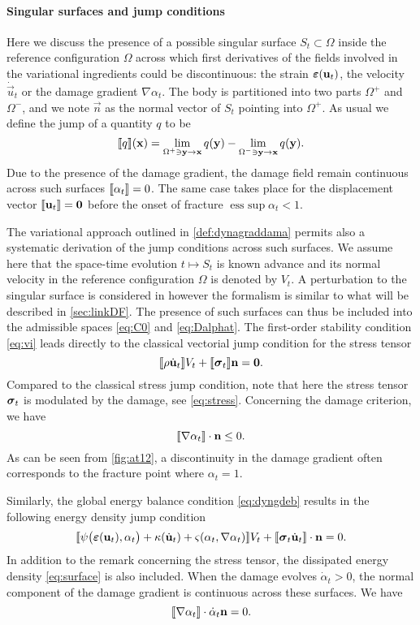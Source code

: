 \paragraph{Singular surfaces and jump conditions}
Here we discuss the presence of a possible singular surface $S_t\subset\Omega$ inside the reference configuration $\Omega$ across which first derivatives of the fields involved in the variational ingredients could be discontinuous: the strain $\eps(\vec{u}_t)$, the velocity $\dot{\vec{u}}_t$ or the damage gradient $\nabla\alpha_t$. The body is partitioned into two parts $\Omega^+$ and $\Omega^-$, and we note $\vec{n}$ as the normal vector of $S_t$ pointing into $\Omega^+$. As usual we define the jump of a quantity $q$ to be
\[
\jump{q}(\vec{x})=\lim_{\Omega{^+}\ni\vec{y}\to\vec{x}}q(\vec{y})-\lim_{\Omega{^-}\ni\vec{y}\to\vec{x}}q(\vec{y}).
\]
Due to the presence of the damage gradient, the damage field remain continuous across such surfaces $\llbracket{\alpha_t}\rrbracket=0$. The same case takes place for the displacement vector $\jump{\vec{u}_t}=\vec{0}$ before the onset of fracture $\operatorname{ess\ sup}\alpha_t< 1$.

The variational approach outlined in \cref{def:dynagraddama} permits also a systematic derivation of the jump conditions across such surfaces. We assume here that the space-time evolution $t\mapsto S_t$ is known advance and its normal velocity in the reference configuration $\Omega$ is denoted by $V_t$. A perturbation to the singular surface is considered in \cite{BatraBedfordDrumheller:1986} however the formalism is similar to what will be described in \cref{sec:linkDF}. The presence of such surfaces can thus be included into the admissible spaces \eqref{eq:C0} and \eqref{eq:Dalphat}. The first-order stability condition \eqref{eq:vi} leads directly to the classical vectorial jump condition for the stress tensor
\[
\jump{\rho\dot{\vec{u}}_t}V_t+\jump{\sig_t}\vec{n}=\vec{0}.
\]
Compared to the classical stress jump condition, note that here the stress tensor $\sig_t$ is modulated by the damage, see \eqref{eq:stress}. Concerning the damage criterion, we have
\[
\jump{\nabla\alpha_t}\cdot\vec{n}\leq 0.
\]
As can be seen from \cref{fig:at12}, a discontinuity in the damage gradient often corresponds to the fracture point where $\alpha_t=1$.

Similarly, the global energy balance condition \eqref{eq:dyngdeb} results in the following energy density jump condition
\[
\jump{\psi\bigl(\eps(\vec{u}_t),\alpha_t\bigr)+\kappa(\dot{\vec{u}}_t)+\varsigma(\alpha_t,\nabla\alpha_t)}V_t+\jump{\sig_t\dot{\vec{u}}_t}\cdot\vec{n}=0.
\]
In addition to the remark concerning the stress tensor, the dissipated energy density \eqref{eq:surface} is also included. When the damage evolves $\dot{\alpha}_t>0$, the normal component of the damage gradient is continuous across these surfaces. We have
\[
\jump{\nabla\alpha_t}\cdot\dot{\alpha}_t\vec{n}=0.
\]

